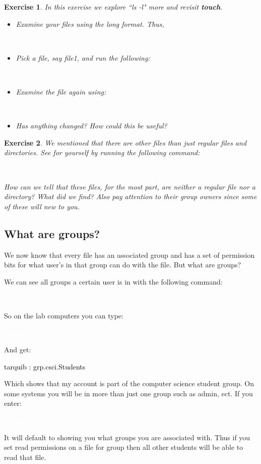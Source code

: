 \documentclass[oneside]{book}
\newcommand{\commandline}[1]{\begin{center} \colorbox{Dark}{\textcolor{white}{#1}} \end{center}}
\newcommand{\exampleout}[1]{\begin{center} \colorbox{Light}{\textcolor{black}{#1}} \end{center}}
\newtheorem{ex}{Exercise}[chapter]
\begin{document}
\begin{ex}
    In this exercise we explore ``ls -l" more and revisit \textbf{touch}.
    \begin{itemize}
            \item Examine your files using the long format. Thus,
                \commandline{ls -l}
            \item Pick a file, say file1, and run the following:
                \commandline{touch file1}
            \item Examine the file again using:
                \commandline{ls -l}
            \item Has anything changed? How could this be useful?
    \end{itemize}
\end{ex}

\begin{ex}
    We mentioned that there are other files than just regular files and directories. See for yourself by running the following command:
        \commandline{ls -l /dev}
    How can we tell that these files, for the most part, are neither a regular file nor a directory? What did we find? Also pay attention to their group owners since some of these will new to you.
\end{ex}

\subsection{What are groups?}
We now know that every file has an associated group and has a set of permission bits for what user's in that group can do with the file. But what are groups?

We can see all groups a certain user is in with the following command:
\commandline{groups username}
So on the lab computers you can type:
\commandline{groups tarquib}
And get:
\exampleout{tarquib : grp.csci.Students}
Which shows that my account is part of the computer science student group. On some systems you will be in more than just one group such as admin, ect. If you enter:
\commandline{groups}
It will default to showing you what groups you are associated with. Thus if you set read permissions on a file for group then all other students will be able to read that file.
\end{document}
